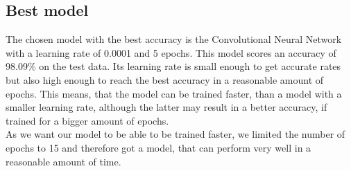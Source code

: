 \documentclass[12pt,a4paper]{scrartcl}		%
\begin{document}
        \subsection{Best model}
            The chosen model with the best accuracy is the Convolutional Neural Network with a learning rate of 0.0001 and 
            5 epochs. This model scores an accuracy of 98.09\% on the test data. Its learning rate is small enough to get accurate rates 
            but also high enough to reach the best accuracy in a reasonable amount of epochs.
            This means, that the model can be trained faster, than a model with a smaller learning rate, although the latter may result 
            in a better accuracy, if trained for a bigger amount of epochs.\\
            As we want our model to be able to be trained faster, we limited the number of epochs to 15 and therefore got a model, that can 
            perform very well in a reasonable amount of time.
\end{document}
